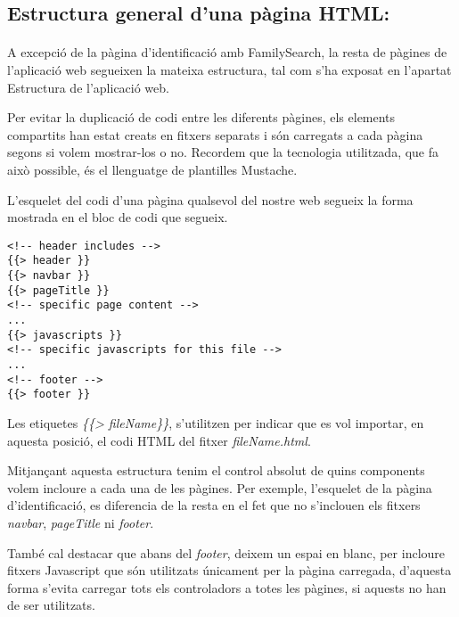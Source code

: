 \subsection{Estructura general d'una pàgina HTML:\@Mustache\@I}

    \paragraph{}
    A excepció de la pàgina d'identificació amb FamilySearch, la resta de pàgines de l'aplicació web segueixen la mateixa estructura, tal com s'ha exposat en l'apartat Estructura de l'aplicació web.

    Per evitar la duplicació de codi entre les diferents pàgines, els elements compartits han estat creats en fitxers separats i són carregats a cada pàgina segons si volem mostrar-los o no. Recordem que la tecnologia utilitzada, que fa això possible, és el llenguatge de plantilles Mustache.

    L'esquelet del codi d'una pàgina qualsevol del nostre web segueix la forma mostrada en el bloc de codi que segueix.

    \begin{lstlisting}[style=rawOwn,caption={Exemple d'inclusió de fitxers HTML amb Mustache}]
<!-- header includes -->
{{> header }}
{{> navbar }}
{{> pageTitle }}
<!-- specific page content -->
...
{{> javascripts }}
<!-- specific javascripts for this file -->
...
<!-- footer -->
{{> footer }}
    \end{lstlisting}

    Les etiquetes \emph{\{\{> fileName\}\}}, s'utilitzen per indicar que es vol importar, en aquesta posició, el codi HTML del fitxer \emph{fileName.html}.

    Mitjançant aquesta estructura tenim el control absolut de quins components volem incloure a cada una de les pàgines. Per exemple, l'esquelet de la pàgina d'identificació, es diferencia de la resta en el fet que no s'inclouen els fitxers \emph{navbar}, \emph{pageTitle} ni  \emph{footer}.

    També cal destacar que abans del \emph{footer}, deixem un espai en blanc, per incloure fitxers Javascript que són utilitzats únicament per la pàgina carregada, d'aquesta forma s'evita carregar tots els controladors a totes les pàgines, si aquests no han de ser utilitzats.
